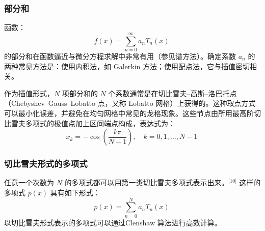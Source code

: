 \subsubsection{部分和}
函数：
$$
f(x) = \sum_{n=0}^{\infty} a_n T_n(x)~
$$
的部分和在函数逼近与微分方程求解中非常有用（参见谱方法）。确定系数 $a_n$ 的两种常见方法是：使用内积法，如 Galerkin 方法；使用配点法，它与插值密切相关。

作为插值形式，$N$ 项部分和的 $N$ 个系数通常是在切比雪夫–高斯–洛巴托点（Chebyshev–Gauss–Lobatto 点，又称 Lobatto 网格）上获得的。这种取点方式可以最小化误差，并避免在均匀网格中常见的龙格现象。这些节点由所用最高阶切比雪夫多项式的极值点加上区间端点构成，表达式为：
$$
x_k = -\cos\left( \frac{k\pi}{N - 1} \right),\quad k = 0, 1, \dots, N - 1~
$$
\subsubsection{切比雪夫形式的多项式}
任意一个次数为 $N$ 的多项式都可以用第一类切比雪夫多项式表示出来。\(^\text{[10]}\)
这样的多项式 $p(x)$ 具有如下形式：
$$
p(x) = \sum_{n=0}^{N} a_n T_n(x)~
$$
以切比雪夫形式表示的多项式可以通过Clenshaw 算法进行高效计算。
